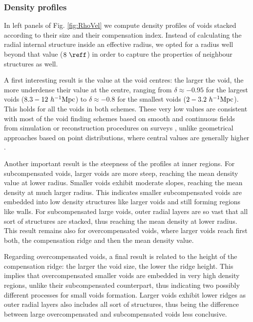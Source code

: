 \documentclass[a4,useAMS,usenatbib,usegraphicx]{latex/mn2e}
\begin{document}
\subsubsection{Density profiles}
\label{subsubsec:density_voids}


In left panels of Fig. \ref{fig:RhoVel} we compute density profiles of 
voids stacked according to their size and their compensation index. 
Instead of calculating the radial internal structure inside an effective
radius, we opted for a radius well beyond that value ($8\ \reff$) in order 
to capture the properties of neighbour structures as well. 


A first interesting result is the value at the void centres: the larger the 
void, the more underdense their value at the centre, ranging from $\delta
\approx-0.95$ for the largest voids ($8.3-12\ \hMpc$) to $\delta\approx 
-0.8$ for the smallest voids ($2-3.2\ \hMpc$). This holds for all the voids 
in both schemes. These very low values are consistent with most of the void 
finding schemes based on smooth and continuous fields from simulation or 
reconstruction procedures on surveys \citep{Plionis02, Colberg05, Shandarin06, 
Platen07, Neyrinck08, MunozCuartas11, Neyrinck13, Ricciardelli2013}, unlike
geometrical approaches based on point distributions, where central values
are generally higher \citep{Colberg08}.


Another important result is the steepness of the profiles at inner
regions. For subcompensated voids, larger voids are more steep, reaching
the mean density value at lower radius. Smaller voids exhibit moderate
slopes, reaching the mean density at much larger radius. This indicates 
smaller subcompensated voids are embedded into low density structures like 
larger voids and still forming regions like walls. For subcompensated large
voids, outer radial layers are so vast that all sort of structures are 
stacked, thus reaching the mean density at lower radius. This result 
remains also for overcompensated voids, where larger voids reach first 
both, the compensation ridge and then the mean density value.


Regarding overcompensated voids, a final result is related to the height 
of the compensation ridge: the larger the void size, the lower the ridge
height. This implies that overcompensated smaller voids are embedded in 
very high density regions, unlike their subcompensated counterpart, thus 
indicating two possibly different processes for small voids formation. 
Larger voids exhibit lower ridges as outer radial layers also includes all
sort of structures, thus being the difference between large overcompensated
and subcompensated voids less conclusive.
\end{document}
